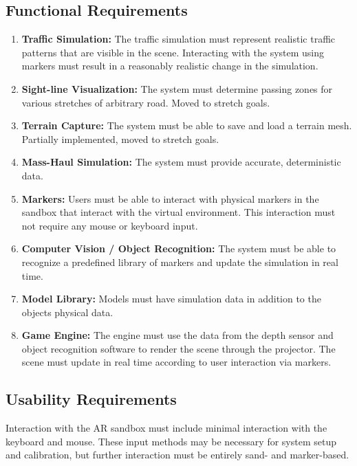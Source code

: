 \documentclass[letterpaper, 10pt, onecolumn, draftclsnofoot]{IEEEtran}
\begin{document}
    \subsection{\textbf{Functional Requirements}}
        \begin{enumerate}[\label={}]
           \item{\textbf{Traffic Simulation:} The traffic simulation must represent realistic traffic patterns that are visible in the scene. Interacting with the system using markers must result in a reasonably realistic change in the simulation.}
        
            \item{\textbf{Sight-line Visualization:} The system must determine passing zones for various stretches of arbitrary road. Moved to stretch goals.}
            
            \item{\textbf{Terrain Capture:} The system must be able to save and load a terrain mesh. Partially implemented, moved to stretch goals.}
            
            \item{\textbf{Mass-Haul Simulation:} The system must provide accurate, deterministic data.}
            
            \item{\textbf{Markers:} Users must be able to interact with physical markers in the sandbox that interact with the virtual environment. This interaction must not require any mouse or keyboard input.}
            
            \item{\textbf{Computer Vision / Object Recognition:} The system must be able to recognize a predefined library of markers and update the simulation in real time.}
            
            \item{\textbf{Model Library:}  Models must have simulation data in addition to the objects physical data.}
        
            \item{\textbf{Game Engine:} The engine must use the data from the depth sensor and object recognition software to render the scene through the projector. The scene must update in real time according to user interaction via markers.}
        \end{enumerate}
    
    \subsection{\textbf{Usability Requirements}}
    Interaction with the AR sandbox must include minimal interaction with the keyboard and mouse. These input methods may be necessary for system setup and calibration, but further interaction must be entirely sand- and marker-based.
    
\end{document}
